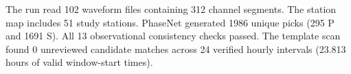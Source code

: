 The run read 102 waveform files containing 312 channel segments. The station map includes 51 study stations. PhaseNet generated 1986 unique picks (295 P and 1691 S). All 13 observational consistency checks passed. The template scan found 0 unreviewed candidate matches across 24 verified hourly intervals (23.813 hours of valid window-start times).
